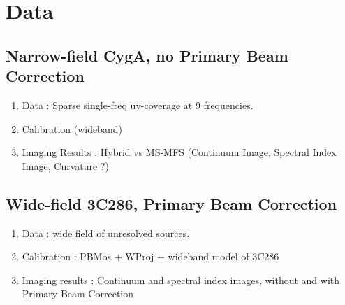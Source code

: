 \documentclass[structabstract]{aa}
\begin{document}

\section{Data}\label{DATA}
\subsection{Narrow-field CygA, no Primary Beam Correction}
\begin{enumerate}
\item Data : Sparse single-freq uv-coverage at 9 frequencies.
\item Calibration (wideband)
\item Imaging Results : Hybrid vs MS-MFS (Continuum Image, Spectral Index Image,
Curvature ?) %
\end{enumerate}
\subsection{Wide-field 3C286, Primary Beam Correction}
\begin{enumerate}
\item Data : wide field of unresolved sources.
\item Calibration : PBMos + WProj + wideband model of 3C286
\item Imaging results : Continuum and spectral index images, without and with Primary Beam Correction
\end{enumerate}

\end{document}
